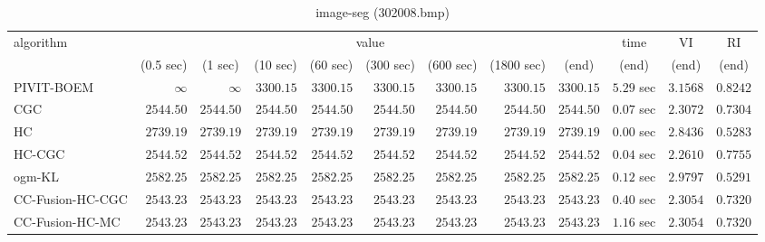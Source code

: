 \begin{table}[H]
\scriptsize
\centering
\caption{image-seg (302008.bmp)}
\label{tab:anytimetable-image-seg-302008.bmp}
\begin{tabular}{lrrrrrrrrrrr}
\toprule
           algorithm &                                   \multicolumn{8}{c}{value} & \multicolumn{1}{c}{time}    & \multicolumn{1}{c}{VI}  & \multicolumn{1}{c}{RI} \\  
\cmidrule(lr){2-9}\cmidrule(lr){10-10} \cmidrule(lr){11-11} \cmidrule(lr){12-12}   
                     & \multicolumn{1}{c}{(0.5 sec)} & \multicolumn{1}{c}{(1 sec)} & \multicolumn{1}{c}{(10 sec)} & \multicolumn{1}{c}{(60 sec)} & \multicolumn{1}{c}{(300 sec)} & \multicolumn{1}{c}{(600 sec)} & \multicolumn{1}{c}{(1800 sec)} & \multicolumn{1}{c}{(end)} & \multicolumn{1}{c}{(end)}    & \multicolumn{1}{c}{(end)}   & \multicolumn{1}{c}{(end)}  \\ \midrule 
          PIVIT-BOEM & $\infty$ & $\infty$ & $      3300.15$ & $      3300.15$ & $      3300.15$ & $      3300.15$ & $      3300.15$ & $      3300.15$ & $         5.29$ sec    & $       3.1568$  & $       0.8242$ \\ 
                 CGC & $      2544.50$ & $      2544.50$ & $      2544.50$ & $      2544.50$ & $      2544.50$ & $      2544.50$ & $      2544.50$ & $      2544.50$ & $         0.07$ sec    & $       2.3072$  & $       0.7304$ \\ 
                  HC & $      2739.19$ & $      2739.19$ & $      2739.19$ & $      2739.19$ & $      2739.19$ & $      2739.19$ & $      2739.19$ & $      2739.19$ & $         0.00$ sec    & $       2.8436$  & $       0.5283$ \\ 
              HC-CGC & $      2544.52$ & $      2544.52$ & $      2544.52$ & $      2544.52$ & $      2544.52$ & $      2544.52$ & $      2544.52$ & $      2544.52$ & $         0.04$ sec    & $       2.2610$  & $       0.7755$ \\ 
              ogm-KL & $      2582.25$ & $      2582.25$ & $      2582.25$ & $      2582.25$ & $      2582.25$ & $      2582.25$ & $      2582.25$ & $      2582.25$ & $         0.12$ sec    & $       2.9797$  & $       0.5291$ \\ 
    CC-Fusion-HC-CGC & $      2543.23$ & $      2543.23$ & $      2543.23$ & $      2543.23$ & $      2543.23$ & $      2543.23$ & $      2543.23$ & $      2543.23$ & $         0.40$ sec    & $       2.3054$  & $       0.7320$ \\ 
     CC-Fusion-HC-MC & $      2543.23$ & $      2543.23$ & $      2543.23$ & $      2543.23$ & $      2543.23$ & $      2543.23$ & $      2543.23$ & $      2543.23$ & $         1.16$ sec    & $       2.3054$  & $       0.7320$ \\ 

\end{tabular}
\end{table}
